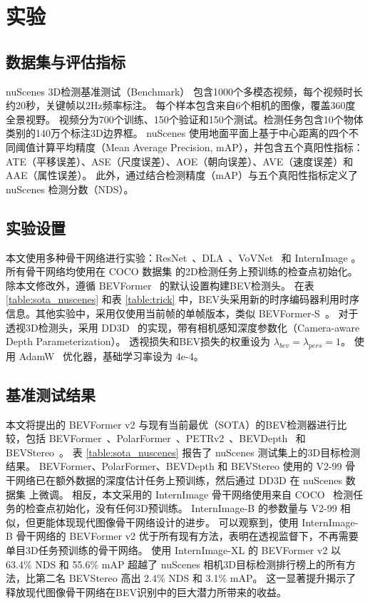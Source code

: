 \section{实验}
\subsection{数据集与评估指标}
nuScenes 3D检测基准测试（Benchmark）\cite{nuscenes} 包含1000个多模态视频，每个视频时长约20秒，关键帧以2Hz频率标注。
每个样本包含来自6个相机的图像，覆盖360度全景视野。
视频分为700个训练、150个验证和150个测试。检测任务包含10个物体类别的140万个标注3D边界框。
nuScenes 使用地面平面上基于中心距离的四个不同阈值计算平均精度（Mean Average Precision, mAP），并包含五个真阳性指标：ATE（平移误差）、ASE（尺度误差）、AOE（朝向误差）、AVE（速度误差）和AAE（属性误差）。
此外，通过结合检测精度（mAP）与五个真阳性指标定义了 nuScenes 检测分数（NDS）。




\subsection{实验设置}
本文使用多种骨干网络进行实验：ResNet~\cite{ResNet}、DLA~\cite{DLA}、VoVNet~\cite{Vovnet} 和 InternImage \cite{InternImage}。
所有骨干网络均使用在 COCO 数据集 \cite{COCO} 的2D检测任务上预训练的检查点初始化。
除本文修改外，遵循 BEVFormer~\cite{bevformer} 的默认设置构建BEV检测头。
在表 \ref{table:sota_nuscenes} 和表 \ref{table:trick} 中，BEV头采用新的时序编码器利用时序信息。其他实验中，采用仅使用当前帧的单帧版本，类似 BEVFormer-S~\cite{bevformer}。
对于透视3D检测头，采用 DD3D~\cite{DD3D} 的实现，带有相机感知深度参数化（Camera-aware Depth Parameterization）。
透视损失和BEV损失的权重设为 $\lambda_{bev}=\lambda_{pers}=1$。
使用 AdamW~\cite{AdamW} 优化器，基础学习率设为 4e-4。

\subsection{基准测试结果}
本文将提出的 BEVFormer v2 与现有当前最优（SOTA）的BEV检测器进行比较，包括 BEVFormer~\cite{bevformer}、PolarFormer~\cite{polarformer}、PETRv2~\cite{petrv2}、BEVDepth~\cite{bevdepth} 和 BEVStereo~\cite{bevstereo}。
表 \ref{table:sota_nuscenes} 报告了 nuScenes 测试集上的3D目标检测结果。
BEVFormer、PolarFormer、BEVDepth 和 BEVStereo 使用的 V2-99 \cite{Vovnet} 骨干网络已在额外数据的深度估计任务上预训练，然后通过 DD3D \cite{DD3D} 在 nuScenes 数据集 \cite{nuscenes} 上微调。
相反，本文采用的 InternImage \cite{InternImage} 骨干网络使用来自 COCO~\cite{COCO} 检测任务的检查点初始化，没有任何3D预训练。
InternImage-B 的参数量与 V2-99 相似，但更能体现现代图像骨干网络设计的进步。
可以观察到，使用 InternImage-B 骨干网络的 BEVFormer v2 优于所有现有方法，表明在透视监督下，不再需要单目3D任务预训练的骨干网络。
使用 InternImage-XL 的 BEVFormer v2 以 63.4\% NDS 和 55.6\% mAP 超越了 nuScenes 相机3D目标检测排行榜上的所有方法，比第二名 BEVStereo 高出 2.4\% NDS 和 3.1\% mAP。
这一显著提升揭示了释放现代图像骨干网络在BEV识别中的巨大潜力所带来的收益。

